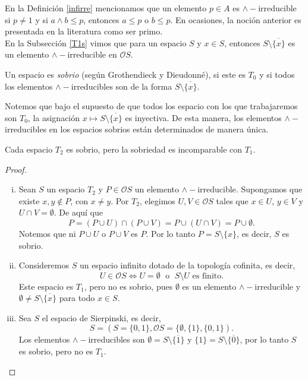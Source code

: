 En la Definición \ref{infirre} mencionamos que un elemento $p\in A$ es $\wedge-$irreducible si $p\neq 1$ y si $a\wedge b\leq p$, entonces $a\leq p$ o $b\leq p$. En ocasiones, la noción anterior es presentada en la literatura como ser primo.\\

En la Subsección \ref{T1s} vimos que para un espacio $S$ y $x\in S$, entonces $S\setminus \overline{\{x\}}$ es un elemento $\wedge-$irreducible en $\mathcal{O}S$.

\begin{dfn}
    Un espacio es \emph{sobrio} (según Grothendieck y Dieudonné), si este es $T_0$ y si todos los elementos $\wedge-$irreducibles son de la forma $S\setminus \overline{\{x\}}$.
\end{dfn}

Notemos que bajo el supuesto de que todos los espacio con los que trabajaremos son $T_0$, la asignación $x\mapsto S\setminus \overline{\{x\}}$ es inyectiva. De esta manera, los elementos $\wedge-$irreducibles en los espacios sobrios están determinados de manera única.

\begin{prop}
    Cada espacio $T_2$ es sobrio, pero la sobriedad es incomparable con $T_1$.
\end{prop}

\begin{proof}
    \begin{enumerate}[i)]
        \item Sean $S$ un espacio $T_2$ y $P\in \mathcal{O}S$ un elemento $\wedge-$irreducible. Supongamos que existe $x, y\notin P$, con $x\neq y$. Por $T_2$, elegimos $U, V\in\mathcal{O}S$ tales que $x\in U$, $y\in V$ y $U\cap V=\emptyset$. De aquí que
        \[
        P=(P\cup U)\cap (P\cup V)=P\cup (U\cap V)=P\cup \emptyset.
        \]
        Notemos que ni $P\cup U$ o $P\cup V$ es $P$. Por lo tanto $P=S\setminus \{x\}$, es decir, $S$ es sobrio.
        \item Consideremos $S$ un espacio infinito dotado de la topología cofinita, es decir, 
        \[
        U\in\mathcal{O}S\Leftrightarrow U=\emptyset\; \mbox{ o }\;S\setminus U \mbox{ es finito}.
        \]
        Este espacio es $T_1$, pero no es sobrio, pues $\emptyset$ es un elemento $\wedge-$irreducible y $\emptyset\neq S\setminus \overline{\{x\}}$ para todo $x\in S$.
        \item Sea $S$ el espacio de Sierpinski, es decir,
        \[
        S=(S=\{0,1\},\mathcal{O}S=\{\emptyset,\{1\},\{0,1\}).
        \]
        Los elementos $\wedge-$irreducibles son $\emptyset=S\setminus\overline{\{1\}}$ y $\{1\}=S\setminus \overline{\{0\}}$, por lo tanto $S$ es sobrio, pero no es $T_1$.
    \end{enumerate}
\end{proof}

